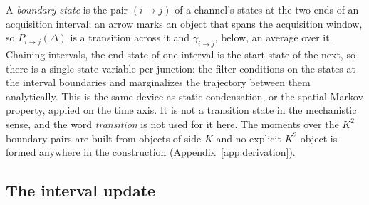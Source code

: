 A \emph{boundary state} is the pair $(i\to j)$ of a channel's states at the two ends of
an acquisition interval; an arrow marks an object that spans the acquisition window, so
$P_{i\to j}(\Delta)$ is a transition across it and $\bar\gamma_{i\to j}$, below, an average
over it. Chaining intervals, the end state of one interval is the start
state of the next, so there is a single state variable per junction: the filter conditions
on the states at the interval boundaries and marginalizes the trajectory between them
analytically. This is the same device as static condensation, or the spatial Markov
property, applied on the time axis. It is not a transition state in the mechanistic sense,
and the word \emph{transition} is not used for it here. The moments over the $K^2$ boundary
pairs are built from objects of side $K$ and no explicit $K^2$ object is formed anywhere in
the construction (Appendix~\ref{app:derivation}).

\subsection*{The interval update}

